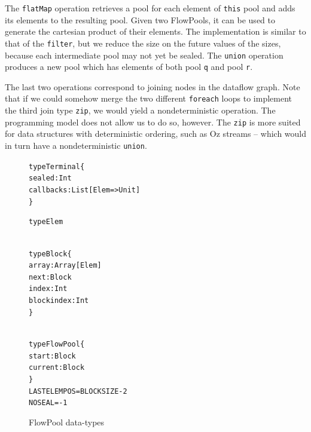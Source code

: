 \documentclass[runningheads,a4paper]{llncs}
\begin{document}
The \verb=flatMap= operation retrieves a pool for each element of
\verb=this= pool and adds its elements to the resulting pool.
Given two FlowPools, it can be used to generate the cartesian product
of their elements.
The implementation is similar to that of the \verb=filter=,
but we reduce the size on the future values of the sizes, because each
intermediate pool may not yet be sealed.
The \verb=union= operation produces a new pool which has elements of
both pool \verb=q= and pool \verb=r=.

The last two operations correspond to joining nodes in the dataflow
graph.
Note that if we could somehow merge the two different \verb=foreach=
loops to implement the third join type \verb=zip=, we would
yield a nondeterministic operation.
The programming model does not allow us to do so, however.
The \verb=zip= is more suited for data structures with deterministic ordering,
such as Oz streams -- which would in turn have a nondeterministic \verb=union=.



\begin{figure}[t]

\centering

\begin{minipage}[b]{4.5 cm}
\begin{alltt}
{\scriptsize
type Terminal \{
  sealed: Int
  callbacks: List[Elem => Unit]
\}

type Elem
}
\end{alltt}
\end{minipage}
\begin{minipage}[b]{3.5 cm}
\begin{alltt}
{\scriptsize
type Block \{
  array: Array[Elem]
  next: Block
  index: Int
  blockindex: Int
\}
}
\end{alltt}
\end{minipage}
\begin{minipage}[b]{4 cm}
\begin{alltt}
{\scriptsize
type FlowPool \{
  start: Block
  current: Block
\}
LASTELEMPOS = BLOCKSIZE - 2
NOSEAL = -1
}
\end{alltt}
\end{minipage}

\caption{FlowPool data-types}
\label{f-datatypes}
\end{figure}

\setlength\linenumbersep{2pt}
\end{document}
